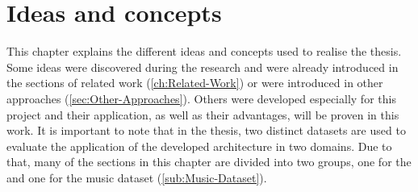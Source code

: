 \chapter{Ideas and concepts}
\label{ch:Ideas-Concepts}
This chapter explains the different ideas and concepts used to realise the thesis. Some ideas were discovered during the research and were already introduced in the sections of related work (\ref{ch:Related-Work}) or were introduced in other approaches (\ref{sec:Other-Approaches}). Others were developed especially for this project and their application, as well as their advantages, will be proven in this work.
\newline
\newline
It is important to note that in the thesis, two distinct datasets are used to evaluate the application of the developed architecture in two domains. Due to that, many of the sections in this chapter are divided into two groups, one for the  and one for the music dataset (\ref{sub:Music-Dataset}).

